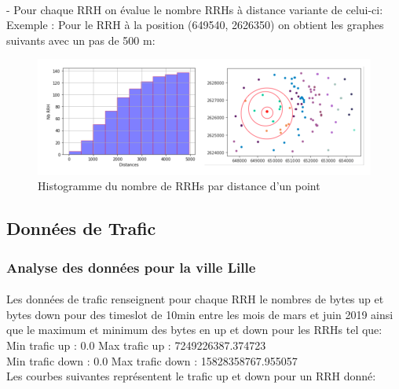 \documentclass{report}
\begin{document}
\paragraph{}
- Pour chaque RRH on évalue le nombre RRHs à distance variante de celui-ci:\\
Exemple : Pour le RRH à la position (649540, 2626350) on obtient les graphes suivants avec un pas de 500 m:\\
\begin{figure}[H]
  \centering
  \includegraphics[scale=0.6]{images/histogramme_rrh_dist.png}
  \caption{Histogramme du nombre de RRHs par distance d'un point}   
  \label{fig:picture}
\end{figure}
\subsection{Données de Trafic}
\subsubsection{Analyse des données pour la ville Lille}
\paragraph{}
Les données de trafic renseignent pour chaque RRH le nombres de bytes up et bytes down pour des timeslot de 10min entre les mois de mars et juin 2019 ainsi que le maximum et minimum des bytes en up et down pour les RRHs tel que:\\
Min trafic up :  0.0  Max trafic up :  7249226387.374723\\
Min trafic down :  0.0  Max trafic down :  15828358767.955057\\
Les courbes suivantes représentent le trafic up et down pour un RRH donné:\\
\end{document}
